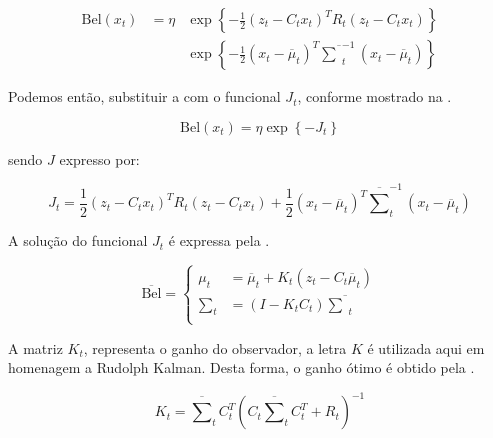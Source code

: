 \begin{equation}
    \label{eq:bayes13}
    \begin{matrix}
        \text{Bel}(x_t)  & = \eta & \exp\left\{  -\displaystyle\frac{1}{2} \left(z_t - C_t x_t\right)^T R_t \left(z_t - C_t x_t\right)  \right\} \\
        & & \exp\left\{ -\displaystyle\frac{1}{2} \left(x_t - \overline{\mu}_t\right)^T \overline{\textstyle\sum}_t^{-1} \left(x_t - \overline{\mu}_t\right) \right\}
    \end{matrix}
\end{equation}

Podemos então, substituir a  com o funcional $J_t$, conforme mostrado na .

\begin{equation}
    \text{Bel}(x_t)  = \eta  \exp\left\{-J_t\right\}
    \label{eq:bayes15}
\end{equation}

\noindent sendo $J$ expresso por:

\begin{equation}
    J_t = \displaystyle\frac{1}{2} \left(z_t - C_t x_t\right)^T R_t \left(z_t - C_t x_t\right)  +
    \displaystyle\frac{1}{2} \left(x_t - \overline{\mu}_t\right)^T \overline{\textstyle\sum}_t^{-1} \left(x_t - \overline{\mu}_t\right)
\end{equation}

A solução do funcional $J_t$ é expressa pela .

\begin{equation}
    \overline{\text{Bel}} = 
    \left\{
    \begin{aligned}
            \mu_t & = \overline{\mu}_t + K_t(z_t -C_t \overline{\mu}_t)\\
            \textstyle\sum_t & = (I-K_tC_t)\overline{\textstyle\sum}_t \\
    \end{aligned} \right.
    \label{eq:bayes14}
\end{equation}

A matriz $K_t$, representa o ganho do observador, a letra $K$ é utilizada aqui em homenagem a Rudolph Kalman. Desta forma, o ganho ótimo é obtido pela .

\begin{equation}
    \label{eq:bayes16}
    K_t = \overline{\textstyle\sum}_tC_t^T(C_t\overline{\textstyle\sum}_tC_t^T+R_t)^{-1}
\end{equation}

